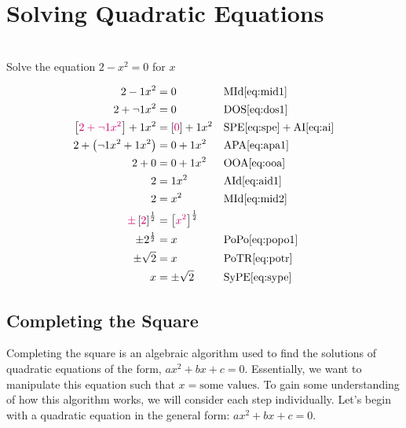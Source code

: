 \section{Solving Quadratic Equations}\label{Solving Quadratic Equations}

\begin{example}[id:20141107-131748] \label{20141107-131748}  \hfill \\

Solve the equation $2-x^2=0$ for $x$

\soln

\solnsteps
\begin{align*}
2-1x^2 &= 0 && \text{MId} \eqref{eq:mid1} \\
2+\neg 1 x^2 &= 0 && \text{DOS} \eqref{eq:dos1} \\
\left[\alert{2+\neg 1x^2} \right] + 1x^2 &= \left[\alert{0}\right]+ 1x^2 && \text{SPE} \eqref{eq:spe} + \text{AI} \eqref{eq:ai} \\
2 + \left(\neg 1x^2 + 1x^2 \right) &= 0 + 1x^2 && \text{APA} \eqref{eq:apa1} \\
2 + 0 &= 0 + 1x^2 && \text{OOA} \eqref{eq:ooa} \\
2 &= 1x^2 && \text{AId} \eqref{eq:aid1} \\
2 &= x^2 && \text{MId} \eqref{eq:mid2} \\
\alert{\pm} \left[\alert{2} \right]^{\frac{1}{2}} &= \left[\alert{x^2}\right]^{\frac{1}{2}} \\ %
\pm 2^{\frac{1}{2}} &= x && \text{PoPo} \eqref{eq:popo1} \\
\pm \sqrt{2} &= x && \text{PoTR} \eqref{eq:potr} \\
x &= \pm \sqrt{2} && \text{SyPE} \eqref{eq:sype} 
\end{align*}
\end{example}

\subsection{Completing the Square}\label{Completing the Square}

Completing the square is an algebraic algorithm used to find the solutions of quadratic equations of the form, $ax^2+bx+c=0$.   Essentially, we want to manipulate this equation such that $x=\text{some values}$.  To gain some understanding of how this algorithm works, we will consider each step individually.  Let's begin with a quadratic equation in the general form: $ax^2+bx+c=0$.\\

